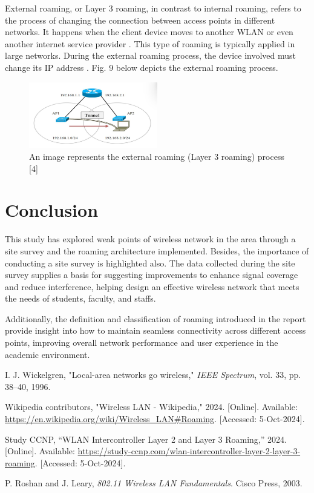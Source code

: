 \documentclass[conference]{IEEEtran}
\begin{document}
External roaming, or Layer 3 roaming, in contrast to internal roaming, refers to the process of changing the connection between access points in different networks. It happens when the client device moves to another WLAN or even another internet service provider \cite{article_example}. This type of roaming is typically applied in large networks. During the external roaming process, the device involved must change its IP address \cite{article_example}. Fig. 9 below depicts the external roaming process.

\begin{figure}
    \centering
    \includegraphics[width=0.5\textwidth]{fig9.png}
    \caption{An image represents the external roaming (Layer 3 roaming) process [4]}
    \label{fig:enter-label}
\end{figure}

\section{Conclusion}
This study has explored weak points of wireless network in the area through a site survey and the roaming architecture implemented. Besides, the importance of conducting a site survey is highlighted also. The data collected during the site survey supplies a basis for suggesting improvements to enhance signal coverage and reduce interference, helping design an effective wireless network that meets the needs of students, faculty, and staffs.

Additionally, the definition and classification of roaming introduced in the report provide insight into how to maintain seamless connectivity across different access points, improving overall network performance and user experience in the academic environment.


\begin{thebibliography}{9}

I. J. Wickelgren, "Local-area networks go wireless," \textit{IEEE Spectrum}, vol. 33, pp. 38--40, 1996.

Wikipedia contributors, "Wireless LAN - Wikipedia," 2024. [Online]. Available: \url{https://en.wikipedia.org/wiki/Wireless_LAN#Roaming}. [Accessed: 5-Oct-2024].

Study CCNP, ``WLAN Intercontroller Layer 2 and Layer 3 Roaming,'' 2024. [Online]. Available: \url{https://study-ccnp.com/wlan-intercontroller-layer-2-layer-3-roaming}. [Accessed: 5-Oct-2024].

P. Roshan and J. Leary, \textit{802.11 Wireless LAN Fundamentals}. Cisco Press, 2003.

\end{thebibliography}
\end{document}

